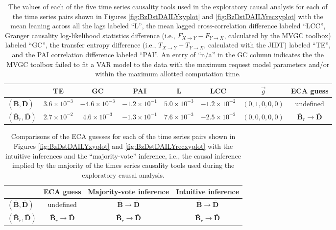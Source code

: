 \begin{table}
\begin{center}
\begin{tabular}{lccccccc}
  & TE & GC & PAI & L & LCC & $\vec{g}$ & ECA guess\\
\midrule
$(\bar{\mathbf{B}},\bar{\mathbf{D}})$ & $3.6\times 10^{-3}$ & $-4.6\times 10^{-3}$ & $-1.2\times 10^{-1}$ & $5.0\times 10^{-3}$ & $-1.2\times 10^{-2}$ & $(0,1,0,0,0)$ & undefined\\
$(\bar{\mathbf{B}}_r,\bar{\mathbf{D}})$ & $2.7\times 10^{-2}$ & $4.6\times 10^{-3}$ & $-1.3\times 10^{-1}$ & $7.6\times 10^{-3}$ & $-2.5\times 10^{-2}$ & $(0,0,0,0,0)$ & $\bar{\mathbf{B}}_r\rightarrow\bar{\mathbf{D}}$
\end{tabular}
\caption[Additional values of each of the five time series causality tools]{The values of each of the five time series causality tools used in the exploratory causal analysis for each of the time series pairs shown in Figures \ref{fig:BzDstDAILYxyplot} and \ref{fig:BzDstDAILYrecxyplot} with the mean leaning across all the lags labeled ``L'', the mean lagged cross-correlation difference labeled ``LCC'', Granger causality log-likelihood statistics difference (i.e., $F_{X\rightarrow Y}-F_{Y\rightarrow X}$, calculated by the MVGC toolbox) labeled ``GC'', the transfer entropy difference (i.e., $T_{X\rightarrow Y}-T_{Y\rightarrow X}$, calculated with the JIDT) labeled ``TE'', and the PAI correlation difference labeled ``PAI''.  An entry of ``n/a'' in the GC column indicates the the MVGC toolbox failed to fit a VAR model to the data with the maximum request model parameters and/or within the maximum allotted computation time.}
\label{tab:SolEx}
\end{center}
\end{table}
\begin{table}
\begin{center}
\begin{tabular}{lccc}
  & ECA guess & Majority-vote inference & Intuitive inference\\
\midrule
$(\bar{\mathbf{B}},\bar{\mathbf{D}})$ & undefined & $\bar{\mathbf{B}}\rightarrow\bar{\mathbf{D}}$ & $\bar{\mathbf{B}}\rightarrow\bar{\mathbf{D}}$\\
$(\bar{\mathbf{B}}_r,\bar{\mathbf{D}})$ & $\bar{\mathbf{B}}_r\rightarrow\bar{\mathbf{D}}$ & $\bar{\mathbf{B}}_r\rightarrow\bar{\mathbf{D}}$ & $\bar{\mathbf{B}}_r\rightarrow\bar{\mathbf{D}}$
\end{tabular}
\caption[Additional comparisons of the ECA guesses]{Comparisons of the ECA guesses for each of the time series pairs shown in Figures \ref{fig:BzDstDAILYxyplot} and \ref{fig:BzDstDAILYrecxyplot} with the intuitive inferences and the ``majority-vote'' inference, i.e., the causal inference implied by the majority of the times series causality tools used during the exploratory causal analysis.}
\label{tab:SolExECAguess}
\end{center}
\end{table}

